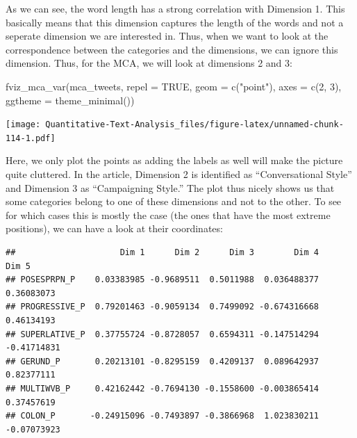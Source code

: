\documentclass[
]{book}
\newenvironment{Shaded}{\begin{snugshade}}{\end{snugshade}}
\newcommand{\AttributeTok}[1]{\textcolor[rgb]{0.77,0.63,0.00}{#1}}
\newcommand{\ConstantTok}[1]{\textcolor[rgb]{0.00,0.00,0.00}{#1}}
\newcommand{\DecValTok}[1]{\textcolor[rgb]{0.00,0.00,0.81}{#1}}
\newcommand{\FunctionTok}[1]{\textcolor[rgb]{0.00,0.00,0.00}{#1}}
\newcommand{\NormalTok}[1]{#1}
\newcommand{\OtherTok}[1]{\textcolor[rgb]{0.56,0.35,0.01}{#1}}
\newcommand{\SpecialCharTok}[1]{\textcolor[rgb]{0.00,0.00,0.00}{#1}}
\newcommand{\StringTok}[1]{\textcolor[rgb]{0.31,0.60,0.02}{#1}}
\begin{document}
As we can see, the word length has a strong correlation with Dimension 1. This basically means that this dimension captures the length of the words and not a seperate dimension we are interested in. Thus, when we want to look at the correspondence between the categories and the dimensions, we can ignore this dimension. Thus, for the MCA, we will look at dimensions 2 and 3:

\begin{Shaded}
\begin{Highlighting}[]
\FunctionTok{fviz\_mca\_var}\NormalTok{(mca\_tweets,}
             \AttributeTok{repel =} \ConstantTok{TRUE}\NormalTok{,}
             \AttributeTok{geom =} \FunctionTok{c}\NormalTok{(}\StringTok{"point"}\NormalTok{),}
             \AttributeTok{axes =} \FunctionTok{c}\NormalTok{(}\DecValTok{2}\NormalTok{, }\DecValTok{3}\NormalTok{),             }
             \AttributeTok{ggtheme =} \FunctionTok{theme\_minimal}\NormalTok{())}
\end{Highlighting}
\end{Shaded}

\texttt{[image: Quantitative-Text-Analysis\_files/figure-latex/unnamed-chunk-114-1.pdf]}

Here, we only plot the points as adding the labels as well will make the picture quite cluttered. In the article, Dimension 2 is identified as ``Conversational Style'' and Dimension 3 as ``Campaigning Style.'' The plot thus nicely shows us that some categories belong to one of these dimensions and not to the other. To see for which cases this is mostly the case (the ones that have the most extreme positions), we can have a look at their coordinates:

\begin{Shaded}
\end{Shaded}

\begin{verbatim}
##                     Dim 1      Dim 2      Dim 3        Dim 4       Dim 5
## POSESPRPN_P    0.03383985 -0.9689511  0.5011988  0.036488377  0.36083073
## PROGRESSIVE_P  0.79201463 -0.9059134  0.7499092 -0.674316668  0.46134193
## SUPERLATIVE_P  0.37755724 -0.8728057  0.6594311 -0.147514294 -0.41714831
## GERUND_P       0.20213101 -0.8295159  0.4209137  0.089642937  0.82377111
## MULTIWVB_P     0.42162442 -0.7694130 -0.1558600 -0.003865414  0.37457619
## COLON_P       -0.24915096 -0.7493897 -0.3866968  1.023830211 -0.07073923
\end{verbatim}
\end{document}
